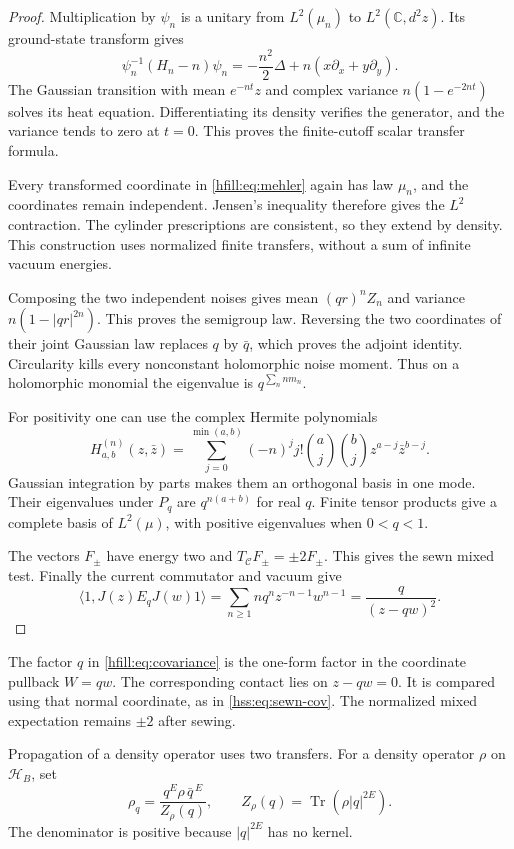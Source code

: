 \begin{proof}
Multiplication by $\psi_n$ is a unitary from $L^2(\mu_n)$
to $L^2(\mathbb C,d^2z)$.
Its ground-state transform gives
\[
 \psi_n^{-1}(H_n-n)\psi_n
 =-\frac{n^2}{2}\Delta+n(x\partial_x+y\partial_y).
\]
The Gaussian transition with mean $e^{-nt}z$ and complex variance
$n(1-e^{-2nt})$ solves its heat equation.
Differentiating its density verifies the generator, and the variance
tends to zero at $t=0$.
This proves the finite-cutoff scalar transfer formula.

Every transformed coordinate in \eqref{hfill:eq:mehler} again has law
$\mu_n$, and the coordinates remain independent.
Jensen's inequality therefore gives the $L^2$ contraction.
The cylinder prescriptions are consistent, so they extend by density.
This construction uses normalized finite transfers, without a sum of
infinite vacuum energies.

Composing the two independent noises gives mean $(qr)^nZ_n$ and variance
$n(1-|qr|^{2n})$.
This proves the semigroup law.
Reversing the two coordinates of their joint Gaussian law replaces
$q$ by $\bar q$, which proves the adjoint identity.
Circularity kills every nonconstant holomorphic noise moment.
Thus on a holomorphic monomial the eigenvalue is $q^{\sum_n n m_n}$.

For positivity one can use the complex Hermite polynomials
\[
 H_{a,b}^{(n)}(z,\bar z)
 =\sum_{j=0}^{\min(a,b)}
   (-n)^j j!\binom aj\binom bj z^{a-j}\bar z^{b-j}.
\]
Gaussian integration by parts makes them an orthogonal basis in one mode.
Their eigenvalues under $P_q$ are $q^{n(a+b)}$ for real $q$.
Finite tensor products give a complete basis of $L^2(\mu)$,
with positive eigenvalues when $0<q<1$.

The vectors $F_\pm$ have energy two and
$T_{\mathcal C}F_\pm=\pm2F_\pm$.
This gives the sewn mixed test.
Finally the current commutator and vacuum give
\[
 \langle1,J(z)E_qJ(w)1\rangle
 =\sum_{n\geq1}nq^n z^{-n-1}w^{n-1}
 =\frac{q}{(z-qw)^2}.
\]
\end{proof}

The factor $q$ in \eqref{hfill:eq:covariance} is the one-form factor
in the coordinate pullback $W=qw$.
The corresponding contact lies on $z-qw=0$.
It is compared using that normal coordinate, as in
\eqref{hss:eq:sewn-cov}.
The normalized mixed expectation remains $\pm2$ after sewing.

Propagation of a density operator uses two transfers.
For a density operator $\rho$ on $\mathcal H_B$, set
\begin{equation}\label{hfill:eq:propagated-density}
 \rho_q=
 \frac{q^E\rho\,\bar q^{\,E}}
      {Z_\rho(q)},
 \qquad Z_\rho(q)=\operatorname{Tr}(\rho|q|^{2E}).
\end{equation}
The denominator is positive because $|q|^{2E}$ has no kernel.


